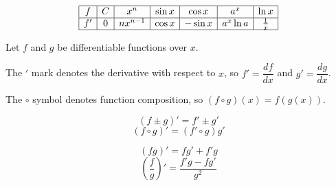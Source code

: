 \documentclass[../main.tex]{subfile}
\begin{document}


{\large\renewcommand{\arraystretch}{1.5}
$$\begin{array}{|*{7}{c|}}
	\hline
	f & C & x^n & \sin x & \cos x & a^x & \ln x \\
	\hline
	f' & 0 & nx^{n-1} & \cos x & -\sin x & a^x\ln a & \frac{1}{x} \\
	\hline
\end{array}$$
}


\vspace{-0.8em}
\begin{center}
Let $f$ and $g$ be differentiable functions over $x$.

The $'$ mark denotes the derivative with respect to $x$, so $f' = \dfrac{df}{dx}$ and $g' = \dfrac{dg}{dx}$.

The $\circ$ symbol denotes function composition, so $(f \circ g)(x) = f(g(x))$.
\end{center}
\vspace{0.5em}

\begin{figure}[h]
{\centering\large
\begin{minipage}{0.49\linewidth}
	$$(f \pm g)' = f' \pm g'$$
	\vspace{0.5em}
	$$(f \circ g)' = (f' \circ g) g'$$
\end{minipage}\hfill
\begin{minipage}{0.49\linewidth}
	$$(fg)' = fg' + f'g$$
	\vspace{0.5em}
	$$\left(\frac{f}{g}\right)' = \frac{f'g - fg'}{g^2}$$
\end{minipage}
}
\end{figure}
\end{document}
